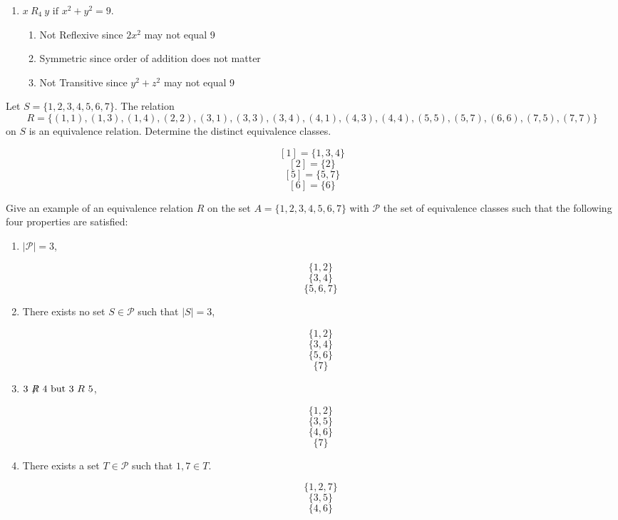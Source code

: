 \documentclass{homework}
\begin{document}
\begin{enumerate}[label=(\alph*)]
\begin{sol}
        \end{sol}
	\item $x \ R_4 \ y \text{ if } x^2 + y^2 = 9$.
        \begin{sol}
            \begin{enumerate}
             \item Not Reflexive since $2x^2$ may not equal 9
              \item Symmetric since order of addition does not matter
              \item Not Transitive since $y^2 + z^2$ may not equal 9
            \end{enumerate}
        \end{sol}
\end{enumerate}

\question Let $S = \{1,2,3,4,5,6,7\}$. The relation
\[
	R = \{(1, 1),(1, 3),(1, 4),(2, 2),(3, 1),(3, 3),(3, 4),(4, 1),(4, 3),(4, 4),(5, 5),(5, 7),(6, 6),(7, 5),(7, 7)\}
\]
on $S$ is an equivalence relation. Determine the distinct equivalence classes.

\begin{sol}
  \[[1]=\{1,3,4\}\]
  \[[2]=\{2\}\]
  \[[5]=\{5,7\}\]
  \[[6]=\{6\}\]
\end{sol}

\question Give an example of an equivalence relation $R$ on the set $A = \{1, 2, 3, 4, 5, 6, 7\}$ with $\mathcal{P}$ the set of equivalence classes such that the following four properties are satisfied:

\begin{enumerate}
	\item $|\mathcal{P}| = 3$,
        \begin{sol}
          \[\{1,2\}\]
          \[\{3,4\}\]
          \[\{5,6,7\}\]
        \end{sol}
	\item There exists no set $S \in \mathcal{P}$ such that $|S| = 3$,
        \begin{sol}
          \[\{1,2\}\]
          \[\{3,4\}\]
          \[\{5,6\}\]
          \[\{7\}\]
        \end{sol}
	\item $3 \ \mathord{\not\mathrel{R}} \ 4 \text{ but } 3 \ R \ 5$,
        \begin{sol}
          \[\{1,2\}\]
          \[\{3,5\}\]
          \[\{4,6\}\]
          \[\{7\}\]
        \end{sol}
	\item There exists a set $T \in \mathcal{P}$ such that $1, 7 \in T$.
        \begin{sol}      
          \[\{1,2,7\}\]
          \[\{3,5\}\]
          \[\{4,6\}\]
        \end{sol}
\end{enumerate}
\end{document}

